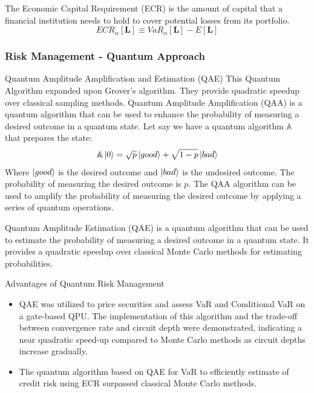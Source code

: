 \documentclass{beamer}
\begin{document}
\begin{frame}
	The Economic Capital Requirement (ECR) is the amount of capital that a financial institution needs to hold to cover potential losses from its portfolio.
	\begin{equation}
		ECR_\alpha[\mathbf{L}] \equiv VaR_\alpha[\mathbf{L}] - E[\mathbf{L}]
	\end{equation}
\end{frame}
\begin{frame}
	\frametitle{Risk Management - Quantum Approach}
	\begin{block}{Quantum Amplitude Amplification and Estimation (QAE)}
	This Quantum Algorithm expanded upon Grover's algorithm. They provide quadratic speedup over classical sampling methods. Quantum Amplitude Amplification (QAA) is a quantum algorithm that can be used to enhance the probability of measuring a desired outcome in a quantum state.
	Let say we have a quantum algorithm \(\mathbb{A}\) that prepares the state:
	\begin{equation}
		\mathbb{A} \ket{0} = \sqrt{p} \ket{good} + \sqrt{1-p} \ket{bad}
	\end{equation}
	Where \(\ket{good}\) is the desired outcome and \(\ket{bad}\) is the undesired outcome. The probability of measuring the desired outcome is \(p\). The QAA algorithm can be used to amplify the probability of measuring the desired outcome by applying a series of quantum operations.
	\end{block}
	

\end{frame}
\begin{frame}
	\begin{block}{}
		Quantum Amplitude Estimation (QAE) is a quantum algorithm that can be used to estimate the probability of measuring a desired outcome in a quantum state. It provides a quadratic speedup over classical Monte Carlo methods for estimating probabilities.
	\end{block}
\end{frame}
\begin{frame}
	\begin{block}{Advantages of Quantum Risk Management}
		\begin{itemize}
			\item QAE was utilized to price
securities and assess VaR and Conditional VaR on a gate-based QPU. The implementation of
this algorithm and the trade-off between convergence rate and circuit depth were demonstrated,
indicating a near quadratic speed-up compared to Monte Carlo methods as circuit depths increase
gradually. 
			\item The quantum algorithm based on QAE for VaR to efficiently estimate of credit risk using ECR surpassed classical Monte Carlo methods.
		\end{itemize}
	\end{block}
\end{frame}
\end{document}
